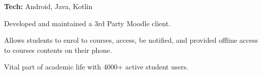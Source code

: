 \documentclass[]{resume}
\begin{document}
\begin{minipage}[t]{0.70\textwidth}
\vspace{2pt}
\textbf{Tech:} Android, Java, Kotlin
\vspace{2pt}
\begin{tightemize}
\item Developed and maintained a 3rd Party Moodle client.
\item Allows students to enrol to courses, access, be notified, and provided offline access to courses contents
on their phone.
\item Vital part of academic life with 4000+ active student users.
\end{tightemize}
\subsectionsep
\primarysectionsep  %


 \end{minipage}
 
\end{document}
